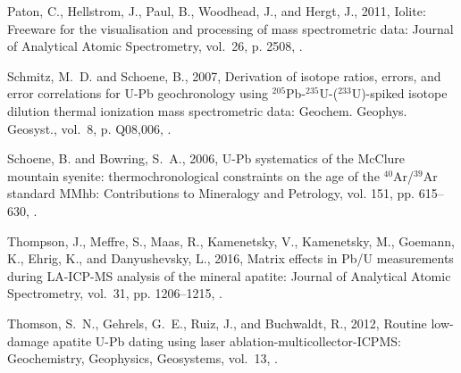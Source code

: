 \documentclass[11pt,letterpaper]{article}
\begin{document}
\begin{thebibliography}{11}
Paton, C., Hellstrom, J., Paul, B., Woodhead, J., and Hergt, J., 2011, Iolite:
  Freeware for the visualisation and processing of mass spectrometric data:
  Journal of Analytical Atomic Spectrometry, vol.~26, p. 2508,
  .

Schmitz, M.~D. and Schoene, B., 2007, {Derivation of isotope ratios, errors,
  and error correlations for U-Pb geochronology using
  $^{205}$Pb-$^{235}$U-($^{233}$U)-spiked isotope dilution thermal ionization
  mass spectrometric data}: Geochem. Geophys. Geosyst., vol.~8, p. Q08,006,
  .

Schoene, B. and Bowring, S.~A., 2006, {U}-{P}b systematics of the {McClure}
  mountain syenite: thermochronological constraints on the age of the
  $^{40}${A}r/$^{39}${A}r standard {MMhb}: Contributions to Mineralogy and
  Petrology, vol. 151, pp. 615--630, .

Thompson, J., Meffre, S., Maas, R., Kamenetsky, V., Kamenetsky, M., Goemann,
  K., Ehrig, K., and Danyushevsky, L., 2016, {Matrix effects in Pb/U
  measurements during {LA}-{ICP}-{MS} analysis of the mineral apatite}: Journal
  of Analytical Atomic Spectrometry, vol.~31, pp. 1206--1215,
  .

Thomson, S.~N., Gehrels, G.~E., Ruiz, J., and Buchwaldt, R., 2012, Routine
  low-damage apatite {U-Pb} dating using laser ablation-multicollector-{ICPMS}:
  Geochemistry, Geophysics, Geosystems, vol.~13, .

\end{thebibliography}

%
%
\end{document}
